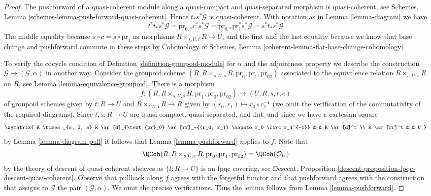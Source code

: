 \begin{proof}
The pushforward of a quasi-coherent module along a quasi-compact and
quasi-separated morphism is quasi-coherent, see Schemes, Lemma
\ref{schemes-lemma-push-forward-quasi-coherent}. Hence $t_*s^*\mathcal{G}$
is quasi-coherent. With notation as in Lemma \ref{lemma-diagram} we have
$$
t^*t_*s^*\mathcal{G} =
\text{pr}_{0, *}c^* s^*\mathcal{G} =
\text{pr}_{0, *}\text{pr}_1^*s^*\mathcal{G} =
s^*t_*s^*\mathcal{G}
$$
The middle equality because $s \circ c = s \circ \text{pr}_1$ as
morphisms $R \times_{s, U, t} R \to U$, and the first and the last
equality because we know that base change and pushforward commute in
these steps by Cohomology of Schemes, Lemma
\ref{coherent-lemma-flat-base-change-cohomology}.

\medskip\noindent
To verify the cocycle condition of Definition \ref{definition-groupoid-module}
for $\alpha$ and the adjointness property we describe the construction
$\mathcal{G} \mapsto (\mathcal{G}, \alpha)$ in another way.
Consider the groupoid scheme
$(R, R \times_{s, U, s} R, \text{pr}_0, \text{pr}_1, \text{pr}_{02})$
associated to the equivalence relation $R \times_{s, U, s} R$
on $R$, see Lemma \ref{lemma-equivalence-groupoid}.
There is a morphism
$$
f :
(R, R \times_{s, U, s} R, \text{pr}_1, \text{pr}_0, \text{pr}_{02})
\longrightarrow
(U, R, s, t, c)
$$
of groupoid schemes given by $t : R \to U$ and $R \times_{t, U, t} R \to R$
given by $(r_0, r_1) \mapsto r_0 \circ r_1^{-1}$ (we omit the verification
of the commutativity of the required diagrams). Since
$t, s : R \to U$ are quasi-compact, quasi-separated, and flat,
and since we have a cartesian square
$$
\xymatrix{
R \times_{s, U, s} R \ar[d]_{\text{pr}_0}
\ar[rr]_-{(r_0, r_1) \mapsto r_0 \circ r_1^{-1}} & & R \ar[d]^t \\
R \ar[rr]^t & & U
}
$$
by Lemma \ref{lemma-diagram-pull} it follows that
Lemma \ref{lemma-pushforward} applies to $f$. Note that
$$
\QCoh(R, R \times_{s, U, s} R, \text{pr}_0, \text{pr}_1, \text{pr}_{02})
= \QCoh(\mathcal{O}_U)
$$
by the theory of descent of quasi-coherent sheaves as $\{t : R \to U\}$
is an fpqc covering, see
Descent, Proposition \ref{descent-proposition-fpqc-descent-quasi-coherent}.
Observe that pullback along $f$ agrees with the forgetful functor and
that pushforward agrees with the construction that assigns to
$\mathcal{G}$ the pair $(\mathcal{G}, \alpha)$. We omit the precise
verifications. Thus the lemma follows from Lemma \ref{lemma-pushforward}.
\end{proof}

